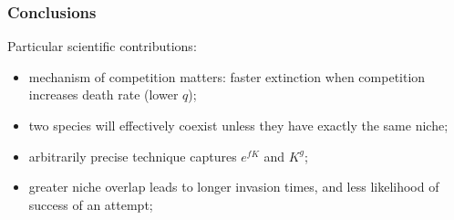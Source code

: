 \documentclass[dvipsnames]{beamer}
\begin{document}
\begin{frame}
\frametitle{Conclusions}
\large{
Particular scientific contributions:
\begin{itemize}
	\item mechanism of competition matters: faster extinction when competition increases death rate (lower $q$);%
	\pause
	\item two species will effectively coexist unless they have exactly the same niche; 
	\pause
	\item arbitrarily precise technique captures $e^{fK}$ and $K^{g}$; 
	\pause
	\item greater niche overlap leads to longer invasion times, and less likelihood of success of an attempt; %
\end{itemize}
%
}
\end{frame}
\end{document}
